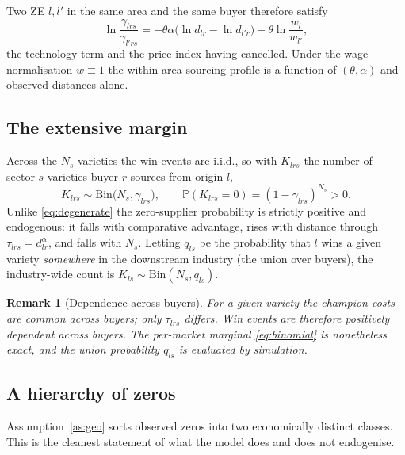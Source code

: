\documentclass[11pt]{article}
\newtheorem{remark}{Remark}
\newcommand{\Bin}{\mathrm{Bin}}
\newcommand{\Prob}{\mathbb{P}}
\begin{document}
Two ZE $l,l'$ in the same area and the same buyer therefore satisfy
\begin{equation}
\ln\frac{\gamma_{lrs}}{\gamma_{l'rs}}=-\theta\alpha\big(\ln d_{lr}-\ln d_{l'r}\big)-\theta\ln\frac{w_{l}}{w_{l'}},
\label{eq:within}
\end{equation}
the technology term and the price index having cancelled. Under the wage normalisation $w\equiv1$
the within-area sourcing profile is a function of $(\theta,\alpha)$ and observed distances alone.

\subsection{The extensive margin}

Across the $N_{s}$ varieties the win events are i.i.d., so with $K_{lrs}$ the number of sector-$s$
varieties buyer $r$ sources from origin $l$,
\begin{equation}
K_{lrs}\sim\Bin\big(N_{s},\gamma_{lrs}\big),
\qquad
\Prob(K_{lrs}=0)=(1-\gamma_{lrs})^{N_{s}}>0 .
\label{eq:binomial}
\end{equation}
Unlike \eqref{eq:degenerate} the zero-supplier probability is strictly positive and endogenous: it
falls with comparative advantage, rises with distance through $\tau_{lrs}=d_{lr}^{\alpha}$, and
falls with $N_{s}$. Letting $q_{ls}$ be the probability that $l$ wins a given variety
\emph{somewhere} in the downstream industry (the union over buyers), the industry-wide count is
$K_{ls}\sim\Bin(N_{s},q_{ls})$.

\begin{remark}[Dependence across buyers]
\label{rem:dependence}
For a given variety the champion costs are common across buyers; only $\tau_{lrs}$ differs. Win
events are therefore positively dependent across buyers. The per-market marginal
\eqref{eq:binomial} is nonetheless exact, and the union probability $q_{ls}$ is evaluated by
simulation.
\end{remark}

\subsection{A hierarchy of zeros}
\label{sec:hierarchy}

Assumption~\ref{as:geo} sorts observed zeros into two economically distinct classes. This is the
cleanest statement of what the model does and does not endogenise.
\end{document}

